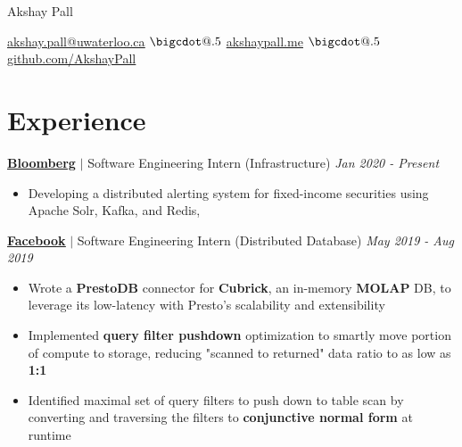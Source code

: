 \documentclass[paper=a4,fontsize=15pt]{scrartcl}
\makeatletter
\newcommand*\bigcdot{\mathpalette\bigcdot@{.5}}
\newcommand*\bigcdot@[2]{\mathbin{\vcenter{\hbox{\scalebox{#2}{$\m@th#1\bullet$}}}}}
\newcommand{\smolboispace}{\vspace*{0.1em}}
\newcommand{\halfspace}{\vspace*{0.5em}}
\newcommand{\bighalfspace}{\vspace*{0.75em}}
\newcommand{\http}[1]{\href{http://#1}{\ul{#1}}}
\newcommand{\https}[1]{\href{https://#1}{\ul{#1}}}
\newcommand{\email}[1]{\href{mailto:#1}{\ul{#1}}}
\makeatother
\begin{document}
\begin{center}
  {\fontsize{35}{40}\selectfont Akshay Pall \par}
  \halfspace
  \smolboispace
  \smolboispace

  {\normalsize
    \email{akshay.pall@uwaterloo.ca}
    $\bigcdot$ \http{akshaypall.me}
    $\bigcdot$ \https{github.com/AkshayPall}
    \par}
\end{center}

\section*{Experience}{}
\normalsize
\noindent \href{https://bloomberg.com}{\textbf{\ul{Bloomberg}}}
$\vert$ \small Software Engineering Intern (Infrastructure)
{\hfill \footnotesize \textit{Jan 2020 - Present}}
\begin{itemize}[noitemsep,leftmargin=20pt,label=\raisebox{0.25ex}{\tiny$\bullet$},topsep=5pt]
  \small
  \item Developing a distributed alerting system for fixed-income securities using Apache Solr,
  Kafka, and Redis, 
\end{itemize}

\smolboispace
\smolboispace
\bighalfspace
\normalsize
\noindent \href{https://facebook.com}{\textbf{\ul{Facebook}}}
$\vert$ \small Software Engineering Intern (Distributed Database)
{\hfill \footnotesize \textit{May 2019 - Aug 2019}}
\begin{itemize}[noitemsep,leftmargin=20pt,label=\raisebox{0.25ex}{\tiny$\bullet$},topsep=5pt]
  \small
    \item Wrote a \textbf{PrestoDB} connector for \textbf{Cubrick}, an in-memory \textbf{MOLAP} DB, to leverage its low-latency with Presto's scalability and extensibility
    \item Implemented \textbf{query filter pushdown} optimization to smartly move portion of compute to storage, reducing "scanned to returned" data ratio to as low as \textbf{1:1}
    \item Identified maximal set of query filters to push down to table scan by converting and traversing the filters to \textbf{conjunctive normal form} at runtime
\end{itemize}
\end{document}
